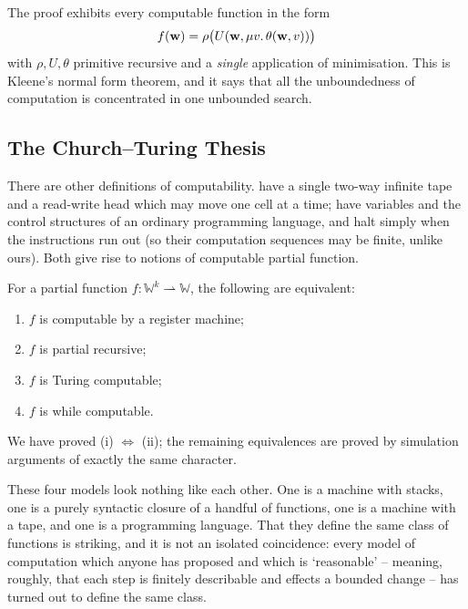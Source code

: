 \documentclass[a4paper]{scrartcl}
\newcommand{\WW}{\mathbb{W}}
\begin{document}
\begin{remark}
	The proof exhibits every computable function in the form
	$$f(\mathbf{w}) = \rho\big(U(\mathbf{w}, \mu v.\,\theta(\mathbf{w},v))\big)$$
	with $\rho, U, \theta$ primitive recursive and a \emph{single} application of minimisation. This is Kleene's normal form theorem, and it says that all the unboundedness of computation is concentrated in one unbounded search.
\end{remark}

\subsection{The Church--Turing Thesis}

There are other definitions of computability.  have a single two-way infinite tape and a read-write head which may move one cell at a time;  have variables and the control structures of an ordinary programming language, and halt simply when the instructions run out (so their computation sequences may be finite, unlike ours). Both give rise to notions of computable partial function.

\begin{theorem}\label{thm:equivalentmodels}
	For a partial function $f \colon \WW^k \rightharpoonup \WW$, the following are equivalent:
	\begin{enumerate}[label=(\roman*)]
		\item $f$ is computable by a register machine;
		\item $f$ is partial recursive;
		\item $f$ is Turing computable;
		\item $f$ is while computable.
	\end{enumerate}
\end{theorem}

We have proved (i) $\iff$ (ii); the remaining equivalences are proved by simulation arguments of exactly the same character.

These four models look nothing like each other. One is a machine with stacks, one is a purely syntactic closure of a handful of functions, one is a machine with a tape, and one is a programming language. That they define the same class of functions is striking, and it is not an isolated coincidence: every model of computation which anyone has proposed and which is `reasonable' -- meaning, roughly, that each step is finitely describable and effects a bounded change -- has turned out to define the same class.
\end{document}
